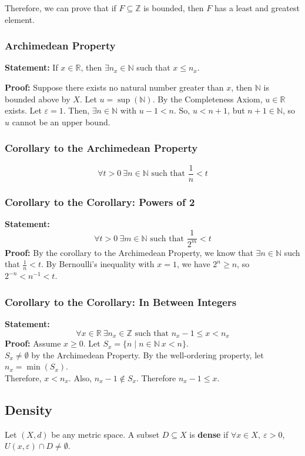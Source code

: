\documentclass[10pt]{extarticle}
\newcommand{\N}{\mathbb{N}}
\newcommand{\Z}{\mathbb{Z}}
\newcommand{\R}{\mathbb{R}}
\begin{document}
    Therefore, we can prove that if $F\subseteq \Z$ is bounded, then $F$ has a least and greatest element.\\
    \subsubsection{Archimedean Property}%
    \textbf{Statement:} If $x\in\R$, then $\exists n_x\in\N$ such that $x\leq n_x$.

    \textbf{Proof:} Suppose there exists no natural number greater than $x$, then $\N$ is bounded above by $X$. Let $u = \sup(\N)$. By the Completeness Axiom, $u\in\R$ exists. Let $\varepsilon = 1$. Then, $\exists n\in\N$ with $u-1 < n$. So, $u < n+1$, but $n+1\in\N$, so $u$ cannot be an upper bound.
    \subsubsection{Corollary to the Archimedean Property}%
      \[
        \forall t > 0~\exists n\in\N \text{ such that } \frac{1}{n}<t
      \] 
    \subsubsection{Corollary to the Corollary: Powers of 2}%
    \textbf{Statement:}
      \[
        \forall t > 0~\exists m\in\N \text{ such that } \frac{1}{2^m} < t
      \] 
    \textbf{Proof:} By the corollary to the Archimedean Property, we know that $\exists n\in \N$ such that $\frac{1}{n} < t$. By Bernoulli's inequality with $x = 1$, we have $2^n \geq n$, so $2^{-n} < n^{-1} < t$.
    \subsubsection{Corollary to the Corollary: In Between Integers}%
    \textbf{Statement:}\[
        \forall x\in\R~\exists n_x\in \Z \text{ such that } n_x-1 \leq x < n_x
      \] 
    \textbf{Proof:} Assume $x \geq 0$. Let $S_x = \{n\mid n\in \N~x < n\}$.\\

      $S_x \neq \emptyset$ by the Archimedean Property. By the well-ordering property, let $n_x = \min(S_x)$.\\

      Therefore, $x < n_x$. Also, $n_x - 1 \notin S_x$. Therefore $n_x - 1 \leq x$.
  \subsection{Density}%
    Let $(X,d)$ be any metric space. A subset $D\subseteq X$ is \textbf{dense} if $\forall x\in X,~ \varepsilon > 0$, $U(x,\varepsilon) \cap D \neq \emptyset$.\\
\end{document}
